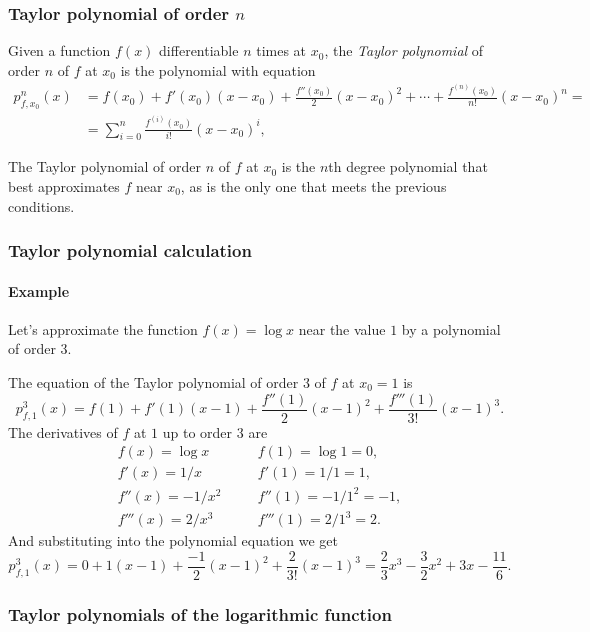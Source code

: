 \begin{frame}
\frametitle{Taylor polynomial of order $n$}
\begin{definition}
Given a function $f(x)$ differentiable $n$ times at $x_0$, the \emph{Taylor polynomial} of order $n$ of $f$ at $x_0$ is the polynomial with equation
\begin{align*}
p_{f,x_0}^n(x) &= f(x_0) + f'(x_0)(x-x_0) + \frac{f''(x_0)}{2}(x-x_0)^2 + \cdots + \frac{f^{(n)}(x_0)}{n!}(x-x_0)^n = \\ 
&= \sum_{i=0}^{n}\frac{f^{(i)}(x_0)}{i!}(x-x_0)^i,
\end{align*}
\end{definition}

The Taylor polynomial of order $n$ of $f$ at $x_0$ is the $n$th degree polynomial that best approximates $f$ near $x_0$, as is the only one that meets the previous conditions.
\end{frame} 


\begin{frame}
\frametitle{Taylor polynomial calculation}
\framesubtitle{Example}
Let's approximate the function $f(x)=\log x$ near the value $1$ by a polynomial of order $3$.

The equation of the Taylor polynomial of order $3$ of $f$ at $x_0=1$ is
\[
p_{f,1}^3(x)=f(1)+f'(1)(x-1)+\frac{f''(1)}{2}(x-1)^2+\frac{f'''(1)}{3!}(x-1)^3.
\]
The derivatives of $f$ at $1$ up to order $3$ are
\[
\begin{array}{lll}
f(x)=\log x & \quad & f(1)=\log 1 =0,\\
f'(x)=1/x & & f'(1)=1/1=1,\\
f''(x)=-1/x^2 & & f''(1)=-1/1^2=-1,\\
f'''(x)=2/x^3 & & f'''(1)=2/1^3=2.
\end{array}
\]
And substituting into the polynomial equation we get
\[
p_{f,1}^3(x)=0+1(x-1)+\frac{-1}{2}(x-1)^2+\frac{2}{3!}(x-1)^3= \frac{2}{3}x^3-\frac{3}{2}x^2+3x-\frac{11}{6}.
\]
\end{frame}


\begin{frame}
\frametitle{Taylor polynomials of the logarithmic function}
\begin{center}

\end{center}
\end{frame}



